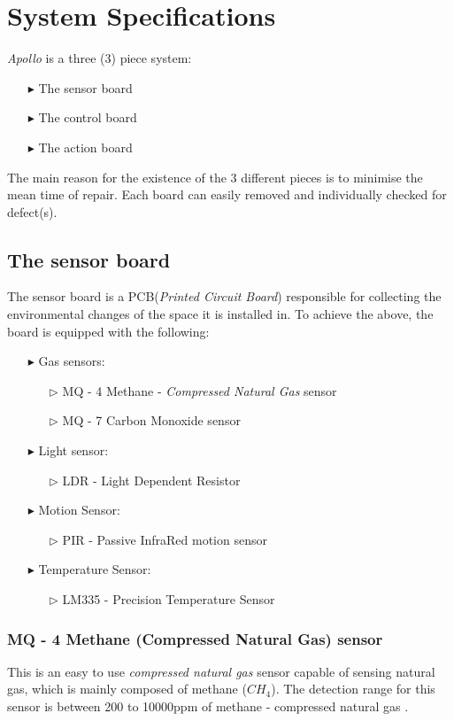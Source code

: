 \documentclass[12pt,a4paper,draft]{report}
\begin{document}
\chapter{System Specifications}
%
\emph{Apollo} is a three (3) piece system:
%
\begin{itemize}
\item[$\blacktriangleright$] The sensor board
\item[$\blacktriangleright$] The control board
\item[$\blacktriangleright$] The action board
\end{itemize}
The main reason for the existence of the 3 different pieces is to minimise the mean time of repair. Each board can easily removed and individually checked for defect(s).
%
\section{The sensor board}
%
The sensor board is a PCB(\textit{Printed Circuit Board}) responsible for collecting the environmental changes of the space it is installed in. To achieve the above, the board is equipped with the following:
%
\begin{itemize}
\item[$\blacktriangleright$]Gas sensors:
	\begin{itemize}
	\item[$\triangleright$] MQ - 4 Methane - \textit{Compressed Natural Gas} sensor
	\item[$\triangleright$] MQ - 7 Carbon Monoxide  sensor
	\end{itemize}
\item[$\blacktriangleright$]Light sensor:
	\begin{itemize}
	\item[$\triangleright$]LDR - Light Dependent Resistor
	\end{itemize}
\item[$\blacktriangleright$]Motion Sensor:
	\begin{itemize}
	\item[$\triangleright$]PIR - Passive InfraRed motion sensor 
	\end{itemize}
\item[$\blacktriangleright$]Temperature Sensor:
	\begin{itemize}
	\item[$\triangleright$]LM335 - Precision Temperature Sensor
	\end{itemize}
\end{itemize}
%
\subsection{MQ - 4 Methane (Compressed Natural Gas) sensor}
%
This is an easy to use \emph{compressed natural gas} sensor capable of sensing natural gas, which is mainly composed of methane ($CH_4$). The detection range for this sensor is between 200 to 10000ppm of methane  - compressed natural gas \cite{website:mq4}.
\end{document}

